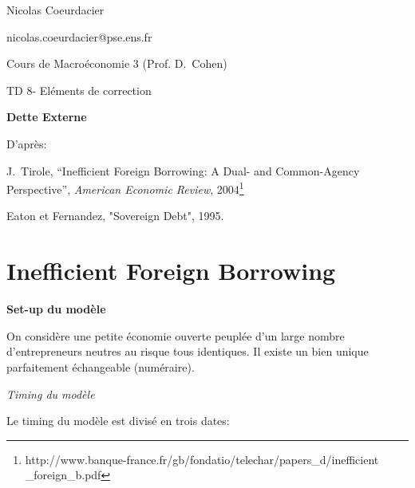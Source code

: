 \documentclass[a4paper]{article}
\begin{document}
{\small Nicolas Coeurdacier}

{\small nicolas.coeurdacier@pse.ens.fr}

{\small Cours de Macro\'{e}conomie 3 (Prof. D.\ Cohen)}

\begin{center}
TD 8- El\'{e}ments de correction

\textbf{Dette Externe}

\bigskip
\end{center}

D'apr\`{e}s:

J.\ Tirole, \textquotedblleft Inefficient Foreign Borrowing: A Dual- and
Common-Agency Perspective\textquotedblright , \textit{American Economic
Review}, 2004\footnote{%
http://www.banque-france.fr/gb/fondatio/telechar/papers\_d/inefficient%
\_foreign\_b.pdf}

Eaton et Fernandez, "Sovereign Debt", 1995.

\section{Inefficient Foreign Borrowing}

\bigskip

\textbf{Set-up du mod\`{e}le}

On consid\`{e}re une petite \'{e}conomie ouverte peupl\'{e}e d'un large
nombre d'entrepreneurs neutres au risque tous identiques. Il existe un bien
unique parfaitement \'{e}changeable (num\'{e}raire).

\bigskip

\textit{Timing du mod\`{e}le}

\bigskip

Le timing du mod\`{e}le est divis\'{e} en trois dates:
\end{document}
